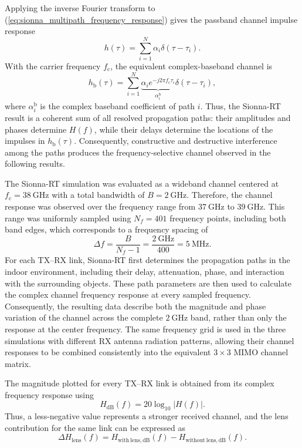\documentclass[10pt]{article}
\begin{document}
Applying the inverse Fourier transform to
(\ref{eq:sionna_multipath_frequency_response}) gives the passband channel
impulse response
\begin{equation}
    h(\tau)
    = \sum_{i=1}^{N}\alpha_i\delta(\tau-\tau_i).
    \label{eq:sionna_passband_impulse_response}
\end{equation}
With the carrier frequency $f_{\mathrm{c}}$, the equivalent complex-baseband
channel is
\begin{equation}
    h_{\mathrm{b}}(\tau)
    = \sum_{i=1}^{N}
      \underbrace{\alpha_i e^{-j2\pi f_{\mathrm{c}}\tau_i}}_
      {\alpha_i^{\mathrm{b}}}
      \delta(\tau-\tau_i),
    \label{eq:sionna_baseband_impulse_response}
\end{equation}
where $\alpha_i^{\mathrm{b}}$ is the complex baseband coefficient of path $i$.
Thus, the Sionna-RT result is a coherent sum of all resolved propagation paths:
their amplitudes and phases determine $H(f)$, while their delays determine the
locations of the impulses in $h_{\mathrm{b}}(\tau)$. Consequently,
constructive and destructive interference among the paths produces the
frequency-selective channel observed in the following results.

The Sionna-RT simulation was evaluated as a wideband channel centered at
$f_{\mathrm{c}}=38~\mathrm{GHz}$ with a total bandwidth of
$B=2~\mathrm{GHz}$. Therefore, the channel response was observed over the
frequency range from $37~\mathrm{GHz}$ to $39~\mathrm{GHz}$. This range was
uniformly sampled using $N_f=401$ frequency points, including both band
edges, which corresponds to a frequency spacing of
\[
    \Delta f=\frac{B}{N_f-1}
    =\frac{2~\mathrm{GHz}}{400}
    =5~\mathrm{MHz}.
\]
For each TX--RX link, Sionna-RT first determines the propagation paths in
the indoor environment, including their delay, attenuation, phase, and
interaction with the surrounding objects. These path parameters are then
used to calculate the complex channel frequency response at every sampled
frequency. Consequently, the resulting data describe both the magnitude
and phase variation of the channel across the complete $2~\mathrm{GHz}$
band, rather than only the response at the center frequency. The same
frequency grid is used in the three simulations with different RX antenna
radiation patterns, allowing their channel responses to be combined
consistently into the equivalent $3\times3$ MIMO channel matrix.

The magnitude plotted for every TX--RX link is obtained from its complex
frequency response using
\begin{equation}
    H_{\mathrm{dB}}(f)=20\log_{10}\left|H(f)\right|.
    \label{eq:sionna_channel_magnitude_db}
\end{equation}
Thus, a less-negative value represents a stronger received channel, and the
lens contribution for the same link can be expressed as
\begin{equation}
    \Delta H_{\mathrm{lens}}(f)
    =H_{\mathrm{with~lens,dB}}(f)
    -H_{\mathrm{without~lens,dB}}(f).
    \label{eq:sionna_lens_channel_gain}
\end{equation}
\end{document}
